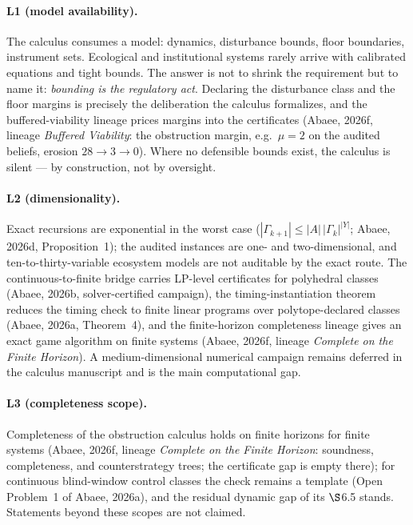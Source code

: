 \documentclass[10pt,twocolumn]{article}
\theoremstyle{definition}
\begin{document}
\paragraph{L1 (model availability).}
The calculus consumes a model: dynamics, disturbance bounds, floor
boundaries, instrument sets. Ecological and institutional systems rarely
arrive with calibrated equations and tight bounds. The answer is not to
shrink the requirement but to name it: \emph{bounding is the regulatory
act}. Declaring the disturbance class and the floor margins is precisely
the deliberation the calculus formalizes, and the buffered-viability
lineage prices margins into the certificates (Abaee, 2026f, lineage \emph{Buffered Viability}: the
obstruction margin, e.g.\ \(\mu = 2\) on the audited beliefs, erosion
\(28 \to 3 \to 0\)). Where no defensible bounds exist, the calculus is
silent --- by construction, not by oversight.

\paragraph{L2 (dimensionality).}
Exact recursions are exponential in the worst case
(\(|\Gamma_{k+1}| \le |A|\,|\Gamma_{k}|^{|Y|}\); Abaee, 2026d,
Proposition~1); the audited instances are one- and two-dimensional, and
ten-to-thirty-variable ecosystem models are not auditable by the exact
route. The continuous-to-finite bridge carries LP-level certificates for
polyhedral classes (Abaee, 2026b, solver-certified campaign), the
timing-instantiation theorem reduces the timing check to finite linear
programs over polytope-declared classes (Abaee, 2026a, Theorem~4), and
the finite-horizon completeness lineage gives an exact game algorithm on
finite systems (Abaee, 2026f, lineage \emph{Complete on the Finite Horizon}). A medium-dimensional numerical campaign
remains deferred in the calculus manuscript and is the main computational
gap.

\paragraph{L3 (completeness scope).}
Completeness of the obstruction calculus holds on finite horizons for
finite systems (Abaee, 2026f, lineage \emph{Complete on the Finite Horizon}: soundness, completeness, and
counterstrategy trees; the certificate gap is empty there); for
continuous blind-window control classes the check remains a template
(Open Problem~1 of Abaee, 2026a), and the residual dynamic gap of its
\(\S\)6.5 stands. Statements beyond these scopes are not claimed.
\end{document}
